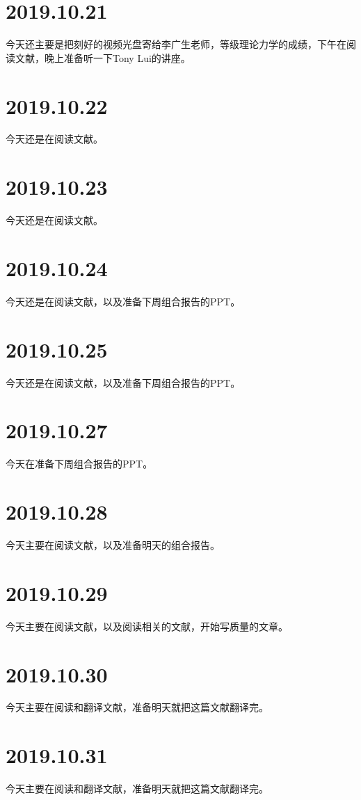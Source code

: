 \section{2019.10.21}
今天还主要是把刻好的视频光盘寄给李广生老师，等级理论力学的成绩，下午在阅读文献\cite{RN1176}，晚上准备听一下Tony Lui的讲座。

\section{2019.10.22}
今天还是在阅读文献\cite{RN1176}。

\section{2019.10.23}
今天还是在阅读文献\cite{RN1176}。

\section{2019.10.24}
今天还是在阅读文献\cite{RN1176}，以及准备下周组合报告的PPT。

\section{2019.10.25}
今天还是在阅读文献\cite{RN1176}，以及准备下周组合报告的PPT。

\section{2019.10.27}
今天在准备下周组合报告的PPT。

\section{2019.10.28}
今天主要在阅读文献\cite{RN1176}，以及准备明天的组合报告。

\section{2019.10.29}
今天主要在阅读文献\cite{RN1176}，以及阅读相关的文献，开始写质量的文章。

\section{2019.10.30}
今天主要在阅读和翻译文献\cite{RN1176}，准备明天就把这篇文献翻译完。

\section{2019.10.31}
今天主要在阅读和翻译文献\cite{RN1176}，准备明天就把这篇文献翻译完。

